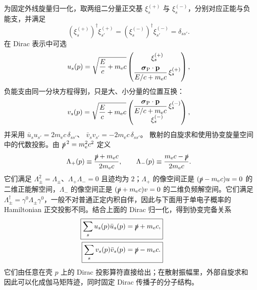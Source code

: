 为固定外线旋量归一化，取两组二分量正交基 $\xi_s^{(+)}$ 与 $\xi_s^{(-)}$，分别对应正能与负能支，并满足
\[
(\xi_s^{(+)})^\dagger\xi_{s'}^{(+)}=(\xi_s^{(-)})^\dagger\xi_{s'}^{(-)}=\delta_{ss'}.
\]
在 Dirac 表示中可选
\begin{equation}
 u_s(p)=
 \sqrt{\frac{E}{c}+m_{\mathrm e} c}
 \begin{pmatrix}
 \xi_s^{(+)}\\[2mm]
 \dfrac{\boldsymbol\sigma_{\rm P}\cdot\mathbf p}{E/c+m_{\mathrm e} c}\,\xi_s^{(+)}
 \end{pmatrix},
 \label{eq:explicit-u}
\end{equation}
负能支由同一分块方程得到，只是大、小分量的位置互换：
\begin{equation}
 v_s(p)=
 \sqrt{\frac{E}{c}+m_{\mathrm e} c}
 \begin{pmatrix}
 \dfrac{\boldsymbol\sigma_{\rm P}\cdot\mathbf p}{E/c+m_{\mathrm e} c}\,\xi_s^{(-)}\\[2mm]
 \xi_s^{(-)}
 \end{pmatrix},
 \label{eq:explicit-v}
\end{equation}
并采用
$\bar u_su_{s'}=2m_{\mathrm e} c\,\delta_{ss'}$、
$\bar v_sv_{s'}=-2m_{\mathrm e} c\,\delta_{ss'}$。
散射的自旋求和使用协变旋量空间中的代数投影。由 $\slashed p^{\,2}=m_{\mathrm e}^2c^2$ 定义
\begin{equation*}
\Lambda_+(p)\equiv\frac{\slashed p+m_{\mathrm e} c}{2m_{\mathrm e} c},
\qquad
\Lambda_-(p)\equiv\frac{m_{\mathrm e} c-\slashed p}{2m_{\mathrm e} c}.
\end{equation*}
它们满足 $\Lambda_\pm^2=\Lambda_\pm$、$\Lambda_+\Lambda_-=0$ 且迹均为 $2$；$\Lambda_+$ 的像空间正是 $(\slashed p-m_{\mathrm e} c)u=0$ 的二维正能解空间，$\Lambda_-$ 的像空间正是 $(\slashed p+m_{\mathrm e} c)v=0$ 的二维负频解空间。它们满足 $\Lambda_\pm^\dagger=\gamma^0\Lambda_\pm\gamma^0$，一般不对普通正定内积自伴，因此与下面用于单电子概率的 Hamiltonian 正交投影不同。结合上面的 Dirac 归一化，得到协变完备关系
\begin{align}
 \boxed{\sum_su_s(p)\bar u_s(p)=\slashed p+m_{\mathrm e} c,}
 &\qquad \label{eq:u-complete}\\
 \boxed{\sum_sv_s(p)\bar v_s(p)=\slashed p-m_{\mathrm e} c.}
 &\qquad \label{eq:v-complete}
\end{align}
它们由任意在壳 $p$ 上的 Dirac 投影算符直接给出；在散射振幅里，外部自旋求和因此可以化成伽马矩阵迹，同时固定 Dirac 传播子的分子结构。



